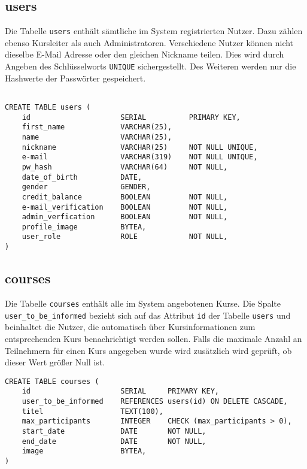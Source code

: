 \subsection{users}
Die Tabelle \texttt{users} enthält sämtliche im System registrierten Nutzer. Dazu zählen ebenso Kursleiter als auch Administratoren. Verschiedene Nutzer können nicht dieselbe E-Mail Adresse oder den gleichen Nickname teilen. Dies wird durch Angeben des Schlüsselworts \texttt{UNIQUE} sichergestellt. Des Weiteren werden nur die Hashwerte der Passwörter gespeichert.
	
\begin{verbatim}

CREATE TABLE users (
    id                     SERIAL          PRIMARY KEY,
    first_name             VARCHAR(25),
    name                   VARCHAR(25),
    nickname               VARCHAR(25)     NOT NULL UNIQUE,
    e-mail                 VARCHAR(319)    NOT NULL UNIQUE,
    pw_hash                VARCHAR(64)     NOT NULL,
    date_of_birth          DATE,
    gender                 GENDER,
    credit_balance         BOOLEAN         NOT NULL,
    e-mail_verification    BOOLEAN         NOT NULL,
    admin_verfication      BOOLEAN         NOT NULL,
    profile_image          BYTEA,
    user_role              ROLE            NOT NULL,
)
\end{verbatim}

\subsection{courses}
Die Tabelle \texttt{courses} enthält alle im System angebotenen Kurse. Die Spalte \texttt{user\_to\_be\_informed} bezieht sich auf das Attribut \texttt{id} der Tabelle \texttt{users} und beinhaltet die Nutzer, die automatisch über Kursinformationen zum entsprechenden Kurs benachrichtigt werden sollen. Falls die maximale Anzahl an Teilnehmern für einen Kurs angegeben wurde wird zusätzlich wird geprüft, ob dieser Wert größer Null ist.

\begin{verbatim}
CREATE TABLE courses (
    id                     SERIAL     PRIMARY KEY,
    user_to_be_informed    REFERENCES users(id) ON DELETE CASCADE,
    titel                  TEXT(100),
    max_participants       INTEGER    CHECK (max_participants > 0),
    start_date             DATE       NOT NULL,
    end_date               DATE       NOT NULL,
    image                  BYTEA,
)
\end{verbatim}

